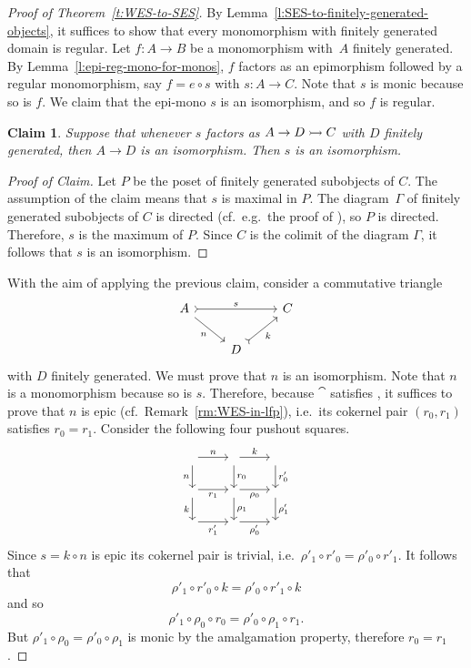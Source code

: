 \documentclass[a4paper,10pt,reqno]{amsart}
\newtheorem{claim}[theorem]{Claim}
\theoremstyle{definition}
\theoremstyle{remark}
\begin{document}
\begin{proof}[Proof of Theorem~\ref{t:WES-to-SES}]
By Lemma~\ref{l:SES-to-finitely-generated-objects}, it suffices to show that every monomorphism with finitely generated domain is regular.
%
Let $f\colon A\to B$ be a monomorphism with~$A$ finitely generated. By Lemma~\ref{l:epi-reg-mono-for-monos}, $f$ factors as an epimorphism followed by a regular monomorphism, say $f=e\circ s$ with $s\colon A \to C$. Note that $s$ is monic because so is $f$. We claim that the epi-mono $s$ is an isomorphism, and so $f$ is regular.


\begin{claim}
	Suppose that whenever $s$ factors as $A\to D\rightarrowtail C$ with $D$ finitely generated, then $A\to D$ is an isomorphism. Then $s$ is an isomorphism.
	\end{claim}
	\begin{proof}[Proof of Claim]
	Let $P$ be the poset of finitely generated subobjects of $C$. The assumption of the claim means that $s$ is maximal in $P$. The diagram~$\Gamma$ of finitely generated subobjects of $C$ is directed (cf.\ e.g.\ the proof of \cite[Theorem~1.70]{ar94book}), so $P$ is directed. Therefore, $s$ is the maximum of $P$. Since $C$ is the colimit of the diagram $\Gamma$, it follows that $s$ is an isomorphism.
	\end{proof}
	With the aim of applying the previous claim, consider a commutative triangle
	\[\begin{tikzcd}
	A \arrow[rightarrowtail]{rr}{s} \arrow{dr}[swap]{n} & & C \\
	& D \arrow[rightarrowtail]{ur}[swap]{k} &
	\end{tikzcd}\]
	with $D$ finitely generated. We must prove that $n$ is an isomorphism. Note that $n$ is a monomorphism because so is $s$. Therefore, because $\cat$ satisfies \WES, it suffices to prove that $n$ is epic (cf.\ Remark~\ref{rm:WES-in-lfp}), i.e.\ its cokernel pair $(r_{0},r_{1})$ satisfies $r_{0}=r_{1}$.
	Consider the following four pushout squares.
	\[\begin{tikzcd}
	{} \arrow{r}{n} \arrow{d}[swap]{n} & {} \arrow{r}{k} \arrow{d}{r_{0}} & {} \arrow{d}{r'_{0}} \\
	{} \arrow{r}[swap]{r_{1}} \arrow{d}[swap]{k} & {} \arrow{r}[swap]{\rho_{0}} \arrow{d}{\rho_{1}}  & {} \arrow{d}{\rho'_{1}}  \\
	{} \arrow{r}[swap]{r'_{1}} & {} \arrow{r}[swap]{\rho'_{0}}  & {} 
	\end{tikzcd}\]
	Since $s=k\circ n$ is epic its cokernel pair is trivial, i.e.\ $\rho'_{1}\circ r'_{0} = \rho'_{0}\circ r'_{1}$. It follows that 
	\[
	\rho'_{1}\circ r'_{0}\circ k = \rho'_{0}\circ r'_{1}\circ k
	\]
	and so 
	\[ 
	\rho'_{1}\circ \rho_{0}\circ r_{0} = \rho'_{0}\circ \rho_{1}\circ r_{1}.
	\]
	But $\rho'_{1}\circ \rho_{0}=\rho'_{0}\circ \rho_{1}$ is monic by the amalgamation property, therefore $r_{0}=r_{1}$.
\end{proof}
\end{document}
